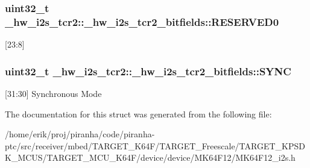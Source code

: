 \subsubsection[{\texorpdfstring{R\+E\+S\+E\+R\+V\+E\+D0}{RESERVED0}}]{\setlength{\rightskip}{0pt plus 5cm}uint32\+\_\+t \+\_\+hw\+\_\+i2s\+\_\+tcr2\+::\+\_\+hw\+\_\+i2s\+\_\+tcr2\+\_\+bitfields\+::\+R\+E\+S\+E\+R\+V\+E\+D0}\hypertarget{struct__hw__i2s__tcr2_1_1__hw__i2s__tcr2__bitfields_a9edd2530a69c0575c3d2fcf347a65187}{}\label{struct__hw__i2s__tcr2_1_1__hw__i2s__tcr2__bitfields_a9edd2530a69c0575c3d2fcf347a65187}
\mbox{[}23\+:8\mbox{]} 
\subsubsection[{\texorpdfstring{S\+Y\+NC}{SYNC}}]{\setlength{\rightskip}{0pt plus 5cm}uint32\+\_\+t \+\_\+hw\+\_\+i2s\+\_\+tcr2\+::\+\_\+hw\+\_\+i2s\+\_\+tcr2\+\_\+bitfields\+::\+S\+Y\+NC}\hypertarget{struct__hw__i2s__tcr2_1_1__hw__i2s__tcr2__bitfields_af6299db3234d56355a233383942d128f}{}\label{struct__hw__i2s__tcr2_1_1__hw__i2s__tcr2__bitfields_af6299db3234d56355a233383942d128f}
\mbox{[}31\+:30\mbox{]} Synchronous Mode 

The documentation for this struct was generated from the following file\+:\begin{DoxyCompactItemize}
\item 
/home/erik/proj/piranha/code/piranha-\/ptc/src/receiver/mbed/\+T\+A\+R\+G\+E\+T\+\_\+\+K64\+F/\+T\+A\+R\+G\+E\+T\+\_\+\+Freescale/\+T\+A\+R\+G\+E\+T\+\_\+\+K\+P\+S\+D\+K\+\_\+\+M\+C\+U\+S/\+T\+A\+R\+G\+E\+T\+\_\+\+M\+C\+U\+\_\+\+K64\+F/device/device/\+M\+K64\+F12/M\+K64\+F12\+\_\+i2s.\+h\end{DoxyCompactItemize}
